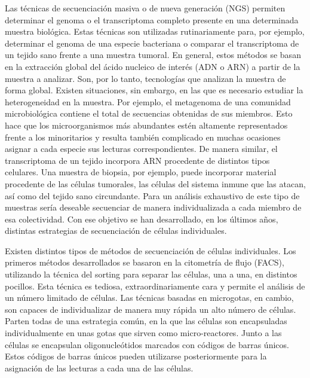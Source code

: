 Las técnicas de secuenciación masiva o de nueva generación (NGS) permiten determinar el genoma o el transcriptoma completo presente en una determinada muestra biológica. Estas técnicas son utilizadas rutinariamente para, por ejemplo, determinar el genoma de una especie bacteriana o comparar el transcriptoma de un tejido sano frente a una muestra tumoral.  En general, estos métodos se basan en la extracción global del ácido nucleico de interés (ADN o ARN) a partir de la muestra a analizar. Son, por lo tanto, tecnologías que analizan la muestra de forma global. Existen situaciones, sin embargo, en las que es necesario estudiar la heterogeneidad en la muestra. Por ejemplo, el metagenoma de una comunidad microbiológica contiene el total de secuencias obtenidas de sus miembros. Esto hace que los microorganismos más abundantes estén altamente representados frente a los minoritarios y resulta también complicado en muchas ocasiones asignar a cada especie sus lecturas correspondientes. De manera similar, el transcriptoma de un tejido incorpora ARN procedente de distintos tipos celulares. Una muestra de biopsia, por ejemplo, puede incorporar material procedente de las células tumorales, las células del sistema inmune que las atacan, así como del tejido sano circundante. Para un análisis exhaustivo de este tipo de muestras sería deseable secuenciar de manera individualizada a cada miembro de esa colectividad. Con ese objetivo se han desarrollado, en los últimos años, distintas estrategias de secuenciación de células individuales.  

Existen distintos tipos de métodos de secuenciación de células individuales. Los primeros métodos desarrollados se basaron en la citometría de flujo (FACS), utilizando la técnica del sorting para separar las células, una a una, en distintos pocillos. Esta técnica es tediosa, extraordinariamente cara y permite el análisis de un número limitado de células. Las técnicas basadas en microgotas, en cambio, son capaces de individualizar de manera muy rápida un alto número de células. Parten todas de una estrategia común, en la que las células son encapsuladas individualmente en unas gotas que sirven como micro-reactores. Junto a las células se encapsulan oligonucleótidos marcados con códigos de barras únicos. Estos códigos de barras únicos pueden utilizarse posteriormente para la asignación de las lecturas a cada una de las células. 


